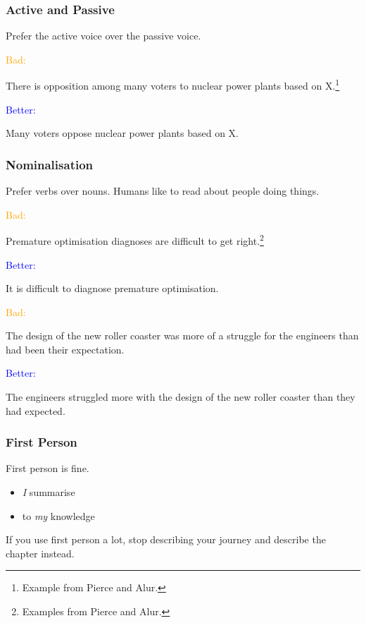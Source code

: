 \documentclass[xetex]{beamer}
\newcommand{\bad}[1]{\textcolor{orange}{#1}}
\newcommand{\good}[1]{\textcolor{blue}{#1}}
\begin{document}
\begin{frame}
  \frametitle{Active and Passive}

  Prefer the active voice over the passive voice.

  \medskip
  \pause

  \bad{Bad:}

  There is opposition among many voters to nuclear power plants based on X.\footnote{Example from Pierce and Alur.}

  \medskip
  \pause

  \good{Better:}

  Many voters oppose nuclear power plants based on X.
\end{frame}

\begin{frame}
  \frametitle{Nominalisation}

  Prefer verbs over nouns.
  Humans like to read about people doing things.

  \pause
  \medskip

  \bad{Bad:}

  Premature optimisation diagnoses are difficult to get right.\footnote{Examples from Pierce and Alur.}

  \medskip
  \pause

  \good{Better:}

  It is difficult to diagnose premature optimisation.

  \pause
  \medskip

  \bad{Bad:}

  The design of the new roller coaster was more of a struggle for the engineers than had been their expectation.

  \medskip
  \pause

  \good{Better:}

  The engineers struggled more with the design of the new roller coaster than they had expected.
\end{frame}

\begin{frame}
  \frametitle{First Person}

  First person is fine.
  \begin{itemize}
    \item \emph{I} summarise
    \item to \emph{my} knowledge
  \end{itemize}

  \medskip
  \pause

  If you use first person a lot, stop describing your journey and describe the chapter instead.
\end{frame}
\end{document}
